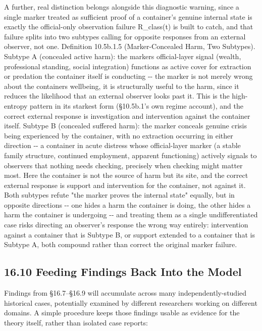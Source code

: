 \documentclass[
]{article}
\begin{document}
A further, real distinction belongs alongside this diagnostic warning,
since a single marker treated as sufficient proof of a container's
genuine internal state is exactly the official-only observation failure
R\_class(t) is built to catch, and that failure splits into two subtypes
calling for opposite responses from an external observer, not one.
Definition 10.5b.1.5 (Marker-Concealed Harm, Two Subtypes). Subtype A
(concealed active harm): the markers official-layer signal (wealth,
professional standing, social integration) functions as active cover for
extraction or predation the container itself is conducting -\/- the
marker is not merely wrong about the containers wellbeing, it is
structurally useful to the harm, since it reduces the likelihood that an
external observer looks past it. This is the high-entropy pattern in its
starkest form (§10.5b.1's own regime account), and the correct external
response is investigation and intervention against the container itself.
Subtype B (concealed suffered harm): the marker conceals genuine crisis
being experienced by the container, with no extraction occurring in
either direction -\/- a container in acute distress whose official-layer
marker (a stable family structure, continued employment, apparent
functioning) actively signals to observers that nothing needs checking,
precisely when checking might matter most. Here the container is not the
source of harm but its site, and the correct external response is
support and intervention for the container, not against it. Both
subtypes refute "the marker proves the internal state" equally, but in
opposite directions -\/- one hides a harm the container is doing, the
other hides a harm the container is undergoing -\/- and treating them as
a single undifferentiated case risks directing an observer's response the
wrong way entirely: intervention against a container that is Subtype B,
or support extended to a container that is Subtype A, both compound
rather than correct the original marker failure.

\hypertarget{feeding-findings-back-into-the-model}{%
\subsection{16.10 Feeding Findings Back Into the
Model}\label{feeding-findings-back-into-the-model}}

Findings from §16.7--§16.9 will accumulate across many
independently-studied historical cases, potentially examined by
different researchers working on different domains. A simple procedure
keeps those findings usable as evidence for the theory itself, rather
than isolated case reports:
\end{document}
